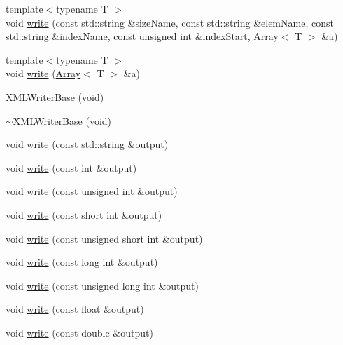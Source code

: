 \begin{DoxyCompactItemize}
\item 
{\footnotesize template$<$typename T $>$ }\\void \mbox{\hyperlink{classXMLWriterAPI_1_1XMLWriterBase_a85d9236f5ec6ccc3c8559d4ec431bf6b}{write}} (const std\+::string \&size\+Name, const std\+::string \&elem\+Name, const std\+::string \&index\+Name, const unsigned int \&index\+Start, \mbox{\hyperlink{classXMLArray_1_1Array}{Array}}$<$ T $>$ \&a)
\item 
{\footnotesize template$<$typename T $>$ }\\void \mbox{\hyperlink{classXMLWriterAPI_1_1XMLWriterBase_a5475e21d716c65a21d620b4cde0c9ca1}{write}} (\mbox{\hyperlink{classXMLArray_1_1Array}{Array}}$<$ T $>$ \&a)
\item 
\mbox{\hyperlink{classXMLWriterAPI_1_1XMLWriterBase_a1620cf7f4428110d2d77b4324293512e}{X\+M\+L\+Writer\+Base}} (void)
\item 
\mbox{\hyperlink{classXMLWriterAPI_1_1XMLWriterBase_a63581e812eb79dbd0e7c8c7574fb73b4}{$\sim$\+X\+M\+L\+Writer\+Base}} (void)
\item 
void \mbox{\hyperlink{classXMLWriterAPI_1_1XMLWriterBase_abc9cd8491179aa022c9b63053f3a7ff8}{write}} (const std\+::string \&output)
\item 
void \mbox{\hyperlink{classXMLWriterAPI_1_1XMLWriterBase_a1c18e91f826057d97bb0d46b9224a830}{write}} (const int \&output)
\item 
void \mbox{\hyperlink{classXMLWriterAPI_1_1XMLWriterBase_a38ff4598155037e936a3a5473fd9d437}{write}} (const unsigned int \&output)
\item 
void \mbox{\hyperlink{classXMLWriterAPI_1_1XMLWriterBase_ac9d330a3600ca9d1ecba541e82919f09}{write}} (const short int \&output)
\item 
void \mbox{\hyperlink{classXMLWriterAPI_1_1XMLWriterBase_abea743f6c1788ff4dc2b8458a01071e0}{write}} (const unsigned short int \&output)
\item 
void \mbox{\hyperlink{classXMLWriterAPI_1_1XMLWriterBase_a84c6c305fdfee1688465eaa73740f7e7}{write}} (const long int \&output)
\item 
void \mbox{\hyperlink{classXMLWriterAPI_1_1XMLWriterBase_aa41f0c59ff0d482ee19ea2e299a9972d}{write}} (const unsigned long int \&output)
\item 
void \mbox{\hyperlink{classXMLWriterAPI_1_1XMLWriterBase_a2e56c14a785820e1f82459988b4e1dd6}{write}} (const float \&output)
\item 
void \mbox{\hyperlink{classXMLWriterAPI_1_1XMLWriterBase_a9fcb104bc58833460bfba6439d90b419}{write}} (const double \&output)

\end{DoxyCompactItemize}
